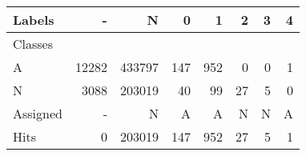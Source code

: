 \begin{tabular}{l|r|r|r|r|r|r|r}

Labels &      - &       N &    0 &    1 &   2 &  3 &  4 \\\hline
Classes  &        &         &      &      &     &    &    \\\hline
\hline
A        &  12282 &  433797 &  147 &  952 &   0 &  0 &  1 \\\hline
N        &   3088 &  203019 &   40 &   99 &  27 &  5 &  0 \\\hline
\hline
Assigned &      - &       N &    A &    A &   N &  N &  A \\\hline
Hits     &      0 &  203019 &  147 &  952 &  27 &  5 &  1 
\end{tabular}


